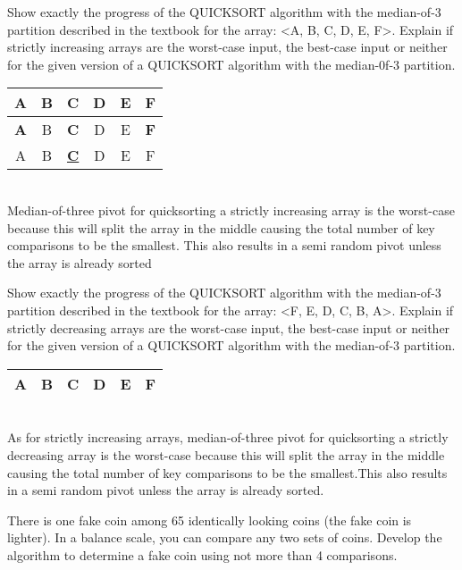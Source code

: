 \documentclass[12pt,largemargins]{homework}
\begin{document}
\begin{alphaparts}
	\item 
	Show exactly the progress of the QUICKSORT algorithm with the median-of-3 partition described in
	the textbook for the array: <A, B, C, D, E, F>. Explain if strictly increasing arrays are the worst-case
	input, the best-case input or neither for the given version of a QUICKSORT algorithm with the median-0f-3 partition.\\
	\begin{tabular}{|c|c|c|c|c|c|}
		\hline
		A&B&C&D&E&F\\
		\hline
		\textbf{A}&B&\textbf{C}&D&E&\textbf{F}\\
		\hline
		A&B&\underline{\textbf{C}}&D&E&F\\
	\end{tabular}\\
	Median-of-three pivot for quicksorting a strictly increasing array is the worst-case because this will split the array in the middle causing the total number of key comparisons to be the smallest. This also results in a semi random pivot unless the array is already sorted
	\item 
	Show exactly the progress of the QUICKSORT algorithm with the median-of-3 partition described
	in the textbook for the array: <F, E, D, C, B, A>. Explain if strictly decreasing arrays are the worst-case
	input, the best-case input or neither for the given version of a QUICKSORT algorithm with the median-of-3 partition.\\
		\begin{tabular}{|c|c|c|c|c|c|}
		\hline
		A&B&C&D&E&F\\
		\hline
	\end{tabular}\\
	As for strictly increasing arrays, median-of-three pivot for quicksorting a strictly decreasing array is the worst-case because this will split the array in the middle causing the total number of key comparisons to be the smallest.This also results in a semi random pivot unless the array is already sorted.
	
\end{alphaparts}
\question
There is one fake coin among 65 identically looking coins (the fake coin is lighter). In a balance scale, you can
compare any two sets of coins. Develop the algorithm to determine a fake coin using not more than 4
comparisons.\\
\end{document}
